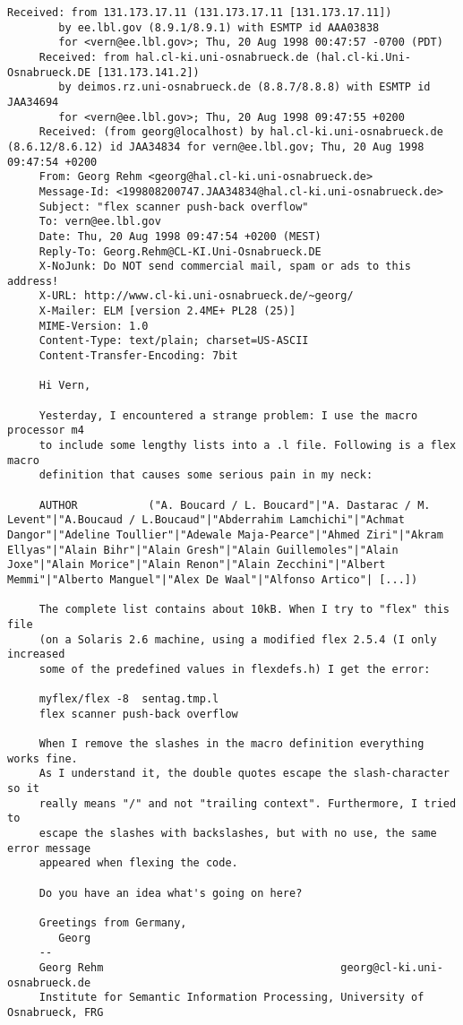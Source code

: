 \documentclass[openany,oneside]{book}
\begin{document}
\begin{verbatim}
Received: from 131.173.17.11 (131.173.17.11 [131.173.17.11])
     	by ee.lbl.gov (8.9.1/8.9.1) with ESMTP id AAA03838
     	for <vern@ee.lbl.gov>; Thu, 20 Aug 1998 00:47:57 -0700 (PDT)
     Received: from hal.cl-ki.uni-osnabrueck.de (hal.cl-ki.Uni-Osnabrueck.DE [131.173.141.2])
     	by deimos.rz.uni-osnabrueck.de (8.8.7/8.8.8) with ESMTP id JAA34694
     	for <vern@ee.lbl.gov>; Thu, 20 Aug 1998 09:47:55 +0200
     Received: (from georg@localhost) by hal.cl-ki.uni-osnabrueck.de (8.6.12/8.6.12) id JAA34834 for vern@ee.lbl.gov; Thu, 20 Aug 1998 09:47:54 +0200
     From: Georg Rehm <georg@hal.cl-ki.uni-osnabrueck.de>
     Message-Id: <199808200747.JAA34834@hal.cl-ki.uni-osnabrueck.de>
     Subject: "flex scanner push-back overflow"
     To: vern@ee.lbl.gov
     Date: Thu, 20 Aug 1998 09:47:54 +0200 (MEST)
     Reply-To: Georg.Rehm@CL-KI.Uni-Osnabrueck.DE
     X-NoJunk: Do NOT send commercial mail, spam or ads to this address!
     X-URL: http://www.cl-ki.uni-osnabrueck.de/~georg/
     X-Mailer: ELM [version 2.4ME+ PL28 (25)]
     MIME-Version: 1.0
     Content-Type: text/plain; charset=US-ASCII
     Content-Transfer-Encoding: 7bit
     
     Hi Vern,
     
     Yesterday, I encountered a strange problem: I use the macro processor m4
     to include some lengthy lists into a .l file. Following is a flex macro
     definition that causes some serious pain in my neck:
     
     AUTHOR           ("A. Boucard / L. Boucard"|"A. Dastarac / M. Levent"|"A.Boucaud / L.Boucaud"|"Abderrahim Lamchichi"|"Achmat Dangor"|"Adeline Toullier"|"Adewale Maja-Pearce"|"Ahmed Ziri"|"Akram Ellyas"|"Alain Bihr"|"Alain Gresh"|"Alain Guillemoles"|"Alain Joxe"|"Alain Morice"|"Alain Renon"|"Alain Zecchini"|"Albert Memmi"|"Alberto Manguel"|"Alex De Waal"|"Alfonso Artico"| [...])
     
     The complete list contains about 10kB. When I try to "flex" this file
     (on a Solaris 2.6 machine, using a modified flex 2.5.4 (I only increased
     some of the predefined values in flexdefs.h) I get the error:
     
     myflex/flex -8  sentag.tmp.l
     flex scanner push-back overflow
     
     When I remove the slashes in the macro definition everything works fine.
     As I understand it, the double quotes escape the slash-character so it
     really means "/" and not "trailing context". Furthermore, I tried to
     escape the slashes with backslashes, but with no use, the same error message
     appeared when flexing the code.
     
     Do you have an idea what's going on here?
     
     Greetings from Germany,
     	Georg
     --
     Georg Rehm                                     georg@cl-ki.uni-osnabrueck.de
     Institute for Semantic Information Processing, University of Osnabrueck, FRG
\end{verbatim}
\end{document}
